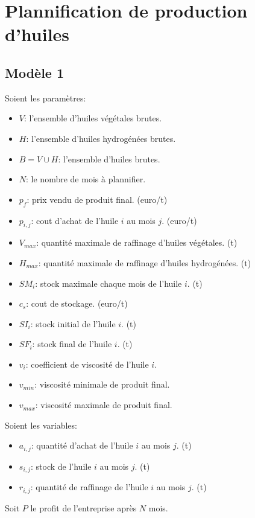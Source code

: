 \documentclass[10pt,a4paper]{article}
\begin{document}
\section{Plannification de production d'huiles}

\subsection{Modèle 1}
Soient les paramètres:
\begin{itemize}
    \item $V$: l'ensemble d'huiles végétales brutes.
    \item $H$: l'ensemble d'huiles hydrogénées brutes.
    \item $B = V \cup H$: l'ensemble d'huiles brutes.
    \item $N$: le nombre de mois à plannifier.
    \item $p_f$: prix vendu de produit final. (euro/t)
    \item $p_{i,j}$: cout d'achat de l'huile $i$ au mois $j$. (euro/t)
    \item $V_{max}$: quantité maximale de raffinage d'huiles végétales. (t)
    \item $H_{max}$: quantité maximale de raffinage d'huiles hydrogénées. (t)
    \item $SM_i$: stock maximale chaque mois de l'huile $i$. (t)
    \item $c_s$: cout de stockage. (euro/t)
    \item $SI_i$: stock initial de l'huile $i$. (t)
    \item $SF_i$: stock final de l'huile $i$. (t)
    \item $v_i$: coefficient de viscosité de l'huile $i$.
    \item $v_{min}$: viscosité minimale de produit final.
    \item $v_{max}$: viscosité maximale de produit final.
\end{itemize}

Soient les variables:
\begin{itemize}
    \item $a_{i,j}$: quantité d'achat de l'huile $i$ au mois $j$. (t)
    \item $s_{i,j}$: stock de l'huile $i$ au mois $j$. (t)
    \item $r_{i,j}$: quantité de raffinage de l'huile $i$ au mois $j$. (t)
\end{itemize}

Soit $P$ le profit de l'entreprise après $N$ mois.
\end{document}
